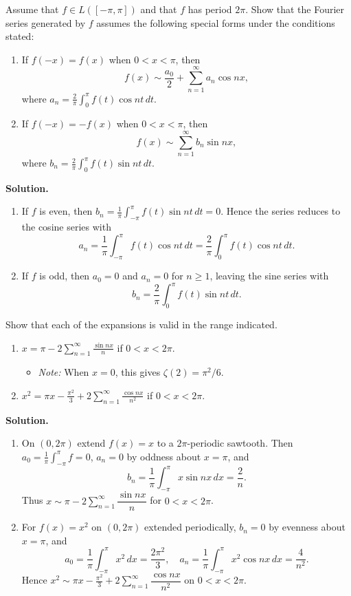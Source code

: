 \begin{problembox}
Assume that $f \in L([-\pi, \pi])$ and that $f$ has period $2\pi$. Show that the Fourier series generated by $f$ assumes the following special forms under the conditions stated:
\begin{enumerate}[label=(\alph*)]
\item If $f(-x) = f(x)$ when $0 < x < \pi$, then
\[
f(x) \sim \frac{a_0}{2} + \sum_{n=1}^\infty a_n \cos nx,
\]
where $a_n = \frac{2}{\pi} \int_0^\pi f(t) \cos nt \, dt$.
\item If $f(-x) = -f(x)$ when $0 < x < \pi$, then
\[
f(x) \sim \sum_{n=1}^\infty b_n \sin nx,
\]
where $b_n = \frac{2}{\pi} \int_0^\pi f(t) \sin nt \, dt$.
\end{enumerate}
\end{problembox}

\noindent\textbf{Solution.}
\begin{enumerate}[label=(\alph*)]
\item If $f$ is even, then $b_n=\tfrac{1}{\pi}\int_{-\pi}^{\pi} f(t)\sin nt\,dt=0$. Hence the series reduces to the cosine series with
\[a_n=\frac{1}{\pi}\int_{-\pi}^{\pi} f(t)\cos nt\,dt=\frac{2}{\pi}\int_0^{\pi} f(t)\cos nt\,dt.\]
\item If $f$ is odd, then $a_0=0$ and $a_n=0$ for $n\ge1$, leaving the sine series with
\[b_n=\frac{2}{\pi}\int_0^{\pi} f(t)\sin nt\,dt.\]
\end{enumerate}

\begin{problembox}
Show that each of the expansions is valid in the range indicated.
\begin{enumerate}[label=(\alph*)]
\item $x = \pi - 2 \sum_{n=1}^\infty \frac{\sin nx}{n}$ if $0 < x < 2\pi$.
\begin{itemize}
\item \textit{Note:} When $x = 0$, this gives $\zeta(2) = \pi^2/6$.
\end{itemize}
\item $x^2 = \pi x - \frac{\pi^2}{3} + 2 \sum_{n=1}^\infty \frac{\cos nx}{n^2}$ if $0 < x < 2\pi$.
\end{enumerate}
\end{problembox}

\noindent\textbf{Solution.}
\begin{enumerate}[label=(\alph*)]
\item On $(0,2\pi)$ extend $f(x)=x$ to a $2\pi$-periodic sawtooth. Then $a_0=\tfrac{1}{\pi}\int_{-\pi}^{\pi} f=0$, $a_n=0$ by oddness about $x=\pi$, and
\[b_n=\frac{1}{\pi}\int_{-\pi}^{\pi} x\sin nx\,dx=\frac{2}{n}.\]
Thus $x\sim \pi-2\sum_{n=1}^{\infty} \dfrac{\sin nx}{n}$ for $0<x<2\pi$.
\item For $f(x)=x^2$ on $(0,2\pi)$ extended periodically, $b_n=0$ by evenness about $x=\pi$, and
\[a_0=\frac{1}{\pi}\int_{-\pi}^{\pi} x^2\,dx=\frac{2\pi^2}{3},\quad a_n=\frac{1}{\pi}\int_{-\pi}^{\pi} x^2\cos nx\,dx=\frac{4}{n^2}.\]
Hence $x^2\sim \pi x-\tfrac{\pi^2}{3}+2\sum_{n=1}^{\infty}\dfrac{\cos nx}{n^2}$ on $0<x<2\pi$.
\end{enumerate}

